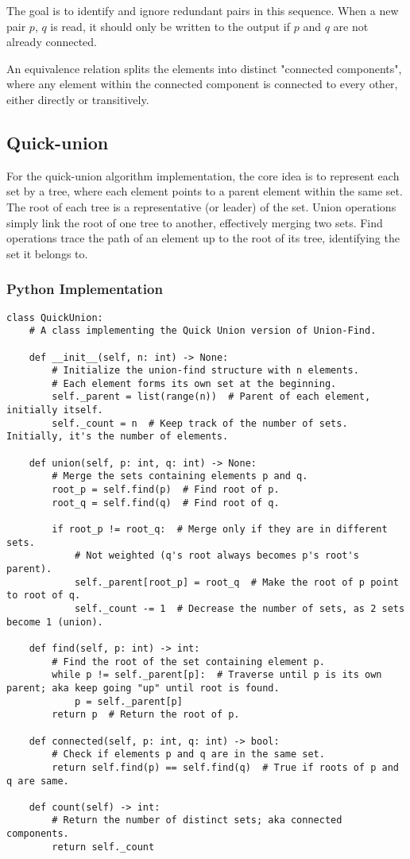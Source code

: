 \documentclass{article}
\begin{document}
The goal is to identify and ignore redundant pairs in this sequence. When a new pair $p$, $q$ is read, it should only be written to the output if $p$ and $q$ are not already connected.

An equivalence relation splits the elements into distinct "connected components", where any element within the connected component is connected to every other, either directly or transitively.

\subsection{Quick-union}

For the quick-union algorithm implementation, the core idea is to represent each set by a tree, where each element points to a parent element within the same set. The root of each tree is a representative (or leader) of the set. Union operations simply link the root of one tree to another, effectively merging two sets. Find operations trace the path of an element up to the root of its tree, identifying the set it belongs to. 

\subsubsection*{Python Implementation}

\begin{verbatim}
class QuickUnion:
    # A class implementing the Quick Union version of Union-Find.

    def __init__(self, n: int) -> None:
        # Initialize the union-find structure with n elements.
        # Each element forms its own set at the beginning.
        self._parent = list(range(n))  # Parent of each element, initially itself.
        self._count = n  # Keep track of the number of sets. Initially, it's the number of elements.

    def union(self, p: int, q: int) -> None:
        # Merge the sets containing elements p and q.
        root_p = self.find(p)  # Find root of p.
        root_q = self.find(q)  # Find root of q.
        
        if root_p != root_q:  # Merge only if they are in different sets.
            # Not weighted (q's root always becomes p's root's parent).
            self._parent[root_p] = root_q  # Make the root of p point to root of q. 
            self._count -= 1  # Decrease the number of sets, as 2 sets become 1 (union).

    def find(self, p: int) -> int:
        # Find the root of the set containing element p.
        while p != self._parent[p]:  # Traverse until p is its own parent; aka keep going "up" until root is found.
            p = self._parent[p]
        return p  # Return the root of p.

    def connected(self, p: int, q: int) -> bool:
        # Check if elements p and q are in the same set.
        return self.find(p) == self.find(q)  # True if roots of p and q are same.

    def count(self) -> int:
        # Return the number of distinct sets; aka connected components.
        return self._count
\end{verbatim}
\end{document}
